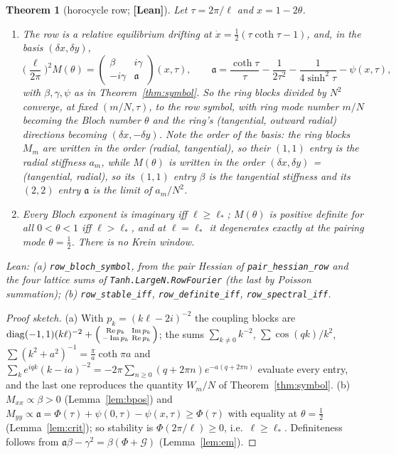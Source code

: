 \documentclass[11pt]{article}
\newtheorem{theorem}{Theorem}[section]
\theoremstyle{definition}
\theoremstyle{remark}
\newcommand{\st}[1]{\textbf{[#1]}}
\newcommand{\lean}[1]{\nolinkurl{#1}}
\begin{document}
\begin{theorem}[horocycle row; \st{Lean}]\label{thm:row}
Let $\tau=2\pi/\ell$ and $x=1-2\theta$.
\begin{enumerate}
\item[(a)] The row is a relative equilibrium drifting at $\dot x=\frac12(\tau\coth\tau-1)$, and, in the basis $(\delta x,\delta y)$,
\[
\Big(\frac\ell{2\pi}\Big)^2M(\theta)=\begin{pmatrix}\beta&i\gamma\\-i\gamma&\mathfrak a\end{pmatrix}(x,\tau),\qquad
\mathfrak a=\frac{\coth\tau}\tau-\frac1{2\tau^2}-\frac1{4\sinh^2\tau}-\psi(x,\tau),
\]
with $\beta,\gamma,\psi$ as in Theorem~\ref{thm:symbol}. So the ring blocks divided by $N^2$ converge, at fixed $(m/N,\tau)$, to
the row symbol, with ring mode number $m/N$ becoming the Bloch number $\theta$ and the ring's (tangential, outward radial)
directions becoming $(\delta x,-\delta y)$. Note the order of the basis: the ring blocks $M_m$ are written in the order
(radial, tangential), so their $(1,1)$ entry is the radial stiffness $a_m$, while $M(\theta)$ is written in the order
$(\delta x,\delta y)$ = (tangential, radial), so its $(1,1)$ entry $\beta$ is the tangential stiffness and its $(2,2)$ entry
$\mathfrak a$ is the limit of $a_m/N^2$.
\item[(b)] Every Bloch exponent is imaginary iff $\ell\ge\ell_*$; $M(\theta)$ is positive definite for all $0<\theta<1$ iff
$\ell>\ell_*$, and at $\ell=\ell_*$ it degenerates exactly at the pairing mode $\theta=\frac12$. There is no Krein window.
\end{enumerate}
Lean: (a) \lean{row_bloch_symbol}, from the pair Hessian of \lean{pair_hessian_row} and the four lattice sums of
\lean{Tanh.LargeN.RowFourier} (the last by Poisson summation); (b) \lean{row_stable_iff}, \lean{row_definite_iff},
\lean{row_spectral_iff}.
\end{theorem}
\begin{proof}[Proof sketch]
(a) With $p_k=(k\ell-2i)^{-2}$ the coupling blocks are $\operatorname{diag}(-1,1)(k\ell)^{-2}+\begin{psmallmatrix}\operatorname{Re}p_k&\operatorname{Im}p_k\\-\operatorname{Im}p_k&\operatorname{Re}p_k\end{psmallmatrix}$;
the sums $\sum_{k\ne0}k^{-2}$, $\sum\cos(qk)/k^2$, $\sum(k^2+a^2)^{-1}=\frac\pi a\coth\pi a$ and
$\sum_ke^{iqk}(k-ia)^{-2}=-2\pi\sum_{n\ge0}(q+2\pi n)e^{-a(q+2\pi n)}$ evaluate every entry, and the last one reproduces the
quantity $W_m/N$ of Theorem~\ref{thm:symbol}.
(b) $M_{xx}\propto\beta>0$ (Lemma~\ref{lem:bpos}) and $M_{yy}\propto\mathfrak a=\Phi(\tau)+\psi(0,\tau)-\psi(x,\tau)\ge\Phi(\tau)$ with
equality at $\theta=\frac12$ (Lemma~\ref{lem:crit}); so stability is $\Phi(2\pi/\ell)\ge0$, i.e.\ $\ell\ge\ell_*$. Definiteness
follows from $\mathfrak a\beta-\gamma^2=\beta(\Phi+\mathcal G)$ (Lemma~\ref{lem:em}).
\end{proof}
\end{document}
